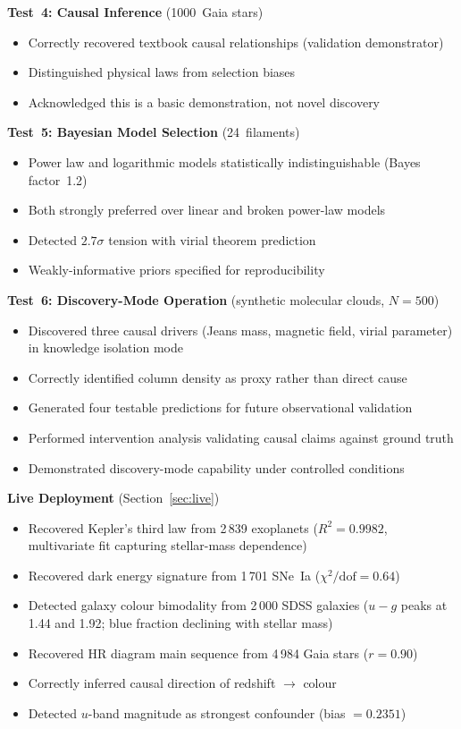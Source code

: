 \documentclass[fleqn,usenatbib]{mnras}
\begin{document}
\textbf{Test~4: Causal Inference} (1000~Gaia stars)
\begin{itemize}
  \item Correctly recovered textbook causal relationships (validation demonstrator)
  \item Distinguished physical laws from selection biases
  \item Acknowledged this is a basic demonstration, not novel discovery
\end{itemize}

\textbf{Test~5: Bayesian Model Selection} (24~filaments)
\begin{itemize}
  \item Power law and logarithmic models statistically indistinguishable (Bayes factor~1.2)
  \item Both strongly preferred over linear and broken power-law models
  \item Detected $2.7\sigma$ tension with virial theorem prediction
  \item Weakly-informative priors specified for reproducibility
\end{itemize}

\textbf{Test~6: Discovery-Mode Operation} (synthetic molecular clouds, $N = 500$)
\begin{itemize}
  \item Discovered three causal drivers (Jeans mass, magnetic field, virial parameter) in knowledge isolation mode
  \item Correctly identified column density as proxy rather than direct cause
  \item Generated four testable predictions for future observational validation
  \item Performed intervention analysis validating causal claims against ground truth
  \item Demonstrated discovery-mode capability under controlled conditions
\end{itemize}

\textbf{Live Deployment} (Section~\ref{sec:live})
\begin{itemize}
  \item Recovered Kepler's third law from 2\,839 exoplanets ($R^{2}=0.9982$, multivariate fit capturing stellar-mass dependence)
  \item Recovered dark energy signature from 1\,701 SNe~Ia ($\chi^{2}/\mathrm{dof}=0.64$)
  \item Detected galaxy colour bimodality from 2\,000 SDSS galaxies ($u{-}g$ peaks at 1.44 and 1.92; blue fraction declining with stellar mass)
  \item Recovered HR diagram main sequence from 4\,984 Gaia stars ($r=0.90$)
  \item Correctly inferred causal direction of redshift $\rightarrow$ colour
  \item Detected $u$-band magnitude as strongest confounder (bias $= 0.2351$)
\end{itemize}
\end{document}
